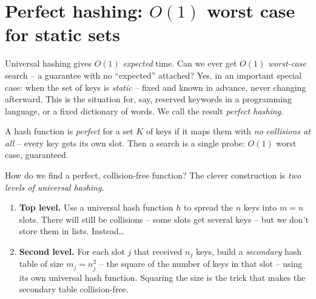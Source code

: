 \section{Perfect hashing: $O(1)$ worst case for static sets}

Universal hashing gives $O(1)$ \emph{expected} time. Can we ever get $O(1)$ \emph{worst-case} search -- a guarantee with no ``expected'' attached? Yes, in an important special case: when the set of keys is \emph{static} -- fixed and known in advance, never changing afterward. This is the situation for, say, reserved keywords in a programming language, or a fixed dictionary of words. We call the result \emph{perfect hashing}.

\begin{formalbox}
A hash function is \emph{perfect} for a set $K$ of keys if it maps them with \emph{no collisions at all} -- every key gets its own slot. Then a search is a single probe: $O(1)$ worst case, guaranteed.
\end{formalbox}

How do we find a perfect, collision-free function? The clever construction is \emph{two levels of universal hashing}.

\begin{enumerate}
  \item \textbf{Top level.} Use a universal hash function $h$ to spread the $n$ keys into $m = n$ slots. There will still be collisions -- some slots get several keys -- but we don't store them in lists. Instead\dots
  \item \textbf{Second level.} For each slot $j$ that received $n_j$ keys, build a \emph{secondary} hash table of size $m_j = n_j^2$ -- the square of the number of keys in that slot -- using its own universal hash function. Squaring the size is the trick that makes the secondary table collision-free.
\end{enumerate}

